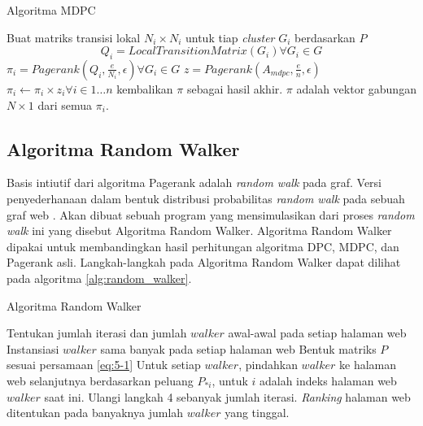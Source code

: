 \documentclass[
	a4paper, %
	12pt, %
	unnumberedsections, %
	twoside, %
]{LTJournalArticle}
\begin{document}
\begin{algorithm}
	\caption{Algoritma MDPC}
	\label{alg:mdpc}
	\begin{algorithmic}[1]
		\State Buat matriks transisi lokal $N_i \times N_i$ untuk tiap \textit{cluster} $G_i$ berdasarkan $P$ 
			\begin{equation*} Q_i = LocalTransitionMatrix(G_i) \forall G_i \in G \end{equation*}
		\State $\pi_i = Pagerank(Q_i, \frac{e}{N_i}, \epsilon) \forall G_i \in G$
		\State $z = Pagerank(A_{mdpc}, \frac{e}{n}, \epsilon)$
		\State $\pi_i \gets \pi_i \times z_i \forall i \in 1 \ldots n$
		\State kembalikan $\pi$ sebagai hasil akhir. $\pi$ adalah vektor gabungan $N \times 1$ dari semua $\pi_i$.
	\end{algorithmic}
\end{algorithm}

\subsection{Algoritma Random Walker}

Basis intiutif dari algoritma Pagerank adalah \textit{random walk} pada graf. Versi penyederhanaan dalam bentuk distribusi probabilitas \textit{random walk} pada sebuah graf web \citep{ilprints422}. Akan dibuat sebuah program yang mensimulasikan dari proses \textit{random walk} ini yang disebut Algoritma Random Walker. Algoritma Random Walker dipakai untuk membandingkan hasil perhitungan algoritma DPC, MDPC, dan Pagerank asli. Langkah-langkah pada Algoritma Random Walker dapat dilihat pada algoritma \ref{alg:random_walker}.

\begin{algorithm}
	\caption{Algoritma Random Walker}
	\label{alg:random_walker}
	\begin{algorithmic}[1]
		\State Tentukan jumlah iterasi dan jumlah $walker$ awal-awal pada setiap halaman web
		\State Instansiasi $walker$ sama banyak pada setiap halaman web
		\State Bentuk matriks $P$ sesuai persamaan \ref{eq:5-1}
		\State Untuk setiap $walker$, pindahkan $walker$ ke halaman web selanjutnya berdasarkan peluang $P_{*i}$, untuk $i$ adalah indeks halaman web $walker$ saat ini.
		\State Ulangi langkah 4 sebanyak jumlah iterasi. \textit{Ranking} halaman web ditentukan pada banyaknya jumlah $walker$ yang tinggal.
	\end{algorithmic}
\end{algorithm}
\end{document}
